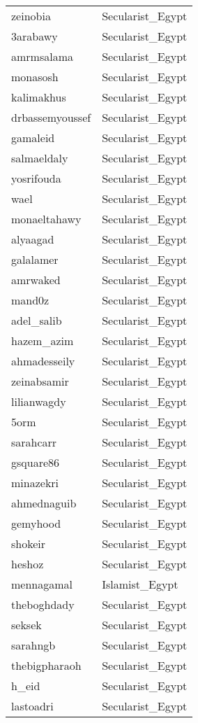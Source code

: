 \begin{longtable}{ll}
  zeinobia & Secularist\_Egypt \\ 
  3arabawy & Secularist\_Egypt \\ 
  amrmsalama & Secularist\_Egypt \\ 
  monasosh & Secularist\_Egypt \\ 
  kalimakhus & Secularist\_Egypt \\ 
  drbassemyoussef & Secularist\_Egypt \\ 
  gamaleid & Secularist\_Egypt \\ 
  salmaeldaly & Secularist\_Egypt \\ 
  yosrifouda & Secularist\_Egypt \\ 
  wael & Secularist\_Egypt \\ 
  monaeltahawy & Secularist\_Egypt \\ 
  alyaagad & Secularist\_Egypt \\ 
  galalamer & Secularist\_Egypt \\ 
  amrwaked & Secularist\_Egypt \\ 
  mand0z & Secularist\_Egypt \\ 
  adel\_salib & Secularist\_Egypt \\ 
  hazem\_azim & Secularist\_Egypt \\ 
  ahmadesseily & Secularist\_Egypt \\ 
  zeinabsamir & Secularist\_Egypt \\ 
  lilianwagdy & Secularist\_Egypt \\ 
  5orm & Secularist\_Egypt \\ 
  sarahcarr & Secularist\_Egypt \\ 
  gsquare86 & Secularist\_Egypt \\ 
  minazekri & Secularist\_Egypt \\ 
  ahmednaguib & Secularist\_Egypt \\ 
  gemyhood & Secularist\_Egypt \\ 
  shokeir & Secularist\_Egypt \\ 
  heshoz & Secularist\_Egypt \\ 
  mennagamal & Islamist\_Egypt \\ 
  theboghdady & Secularist\_Egypt \\ 
  seksek & Secularist\_Egypt \\ 
  sarahngb & Secularist\_Egypt \\ 
  thebigpharaoh & Secularist\_Egypt \\ 
  h\_eid & Secularist\_Egypt \\ 
  lastoadri & Secularist\_Egypt \\ 

\end{longtable}
